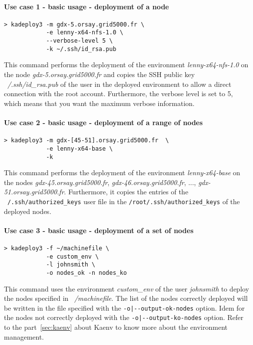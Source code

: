 \documentclass[a4wide,10pt,oneside]{book}
\begin{document}
\paragraph{Use case 1 - basic usage - deployment of a node}
\begin{verbatim}
> kadeploy3 -m gdx-5.orsay.grid5000.fr \
            -e lenny-x64-nfs-1.0 \
            --verbose-level 5 \
            -k ~/.ssh/id_rsa.pub
\end{verbatim}
This command performs the deployment of the environment \textit{lenny-x64-nfs-1.0} on the node \textit{gdx-5.orsay.grid5000.fr} and copies the SSH public key \textit{~/.ssh/id\_rsa.pub} of the user in the deployed environment to allow a direct connection with the root account. Furthermore, the verbose level is set to 5, which means that you want the maximum verbose information.


\paragraph{Use case 2 - basic usage - deployment of a range of nodes}
\begin{verbatim}
> kadeploy3 -m gdx-[45-51].orsay.grid5000.fr  \
            -e lenny-x64-base \
            -k
\end{verbatim}
This command performs the deployment of the environment \textit{lenny-x64-base} on the nodes \textit{gdx-45.orsay.grid5000.fr}, \textit{gdx-46.orsay.grid5000.fr}, ..., \textit{gdx-51.orsay.grid5000.fr}. Furthermore, it copies the entries of the \texttt{~/.ssh/authorized\_keys} user file in the \texttt{/root/.ssh/authorized\_keys} of the deployed nodes.

\paragraph{Use case 3 - basic usage - deployment of a set of nodes}
\begin{verbatim}
> kadeploy3 -f ~/machinefile \
            -e custom_env \
            -l johnsmith \
            -o nodes_ok -n nodes_ko
\end{verbatim}
This command uses the environment \textit{custom\_env} of the user \textit{johnsmith} to deploy the nodes specified in \textit{~/machinefile}. The list of the nodes correctly deployed will be written in the file specified with the \texttt{-o|-{}-output-ok-nodes} option. Idem for the nodes not correctly deployed with the \texttt{-o|-{}-output-ko-nodes} option. Refer to the part~\ref{sec:kaenv} about Kaenv to know more about the environment management.
\end{document}
